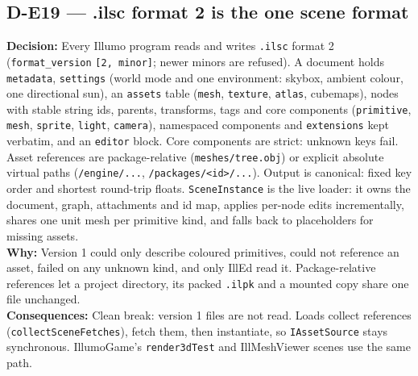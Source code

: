 \subsection*{D-E19 --- .ilsc format 2 is the one scene format}
\begin{decisionbox}[title={D-E19 \quad 2026-09-23}]
\textbf{Decision:} Every Illumo program reads and writes \texttt{.ilsc} format
2 (\texttt{format\_version} \texttt{[2, minor]}; newer minors are refused).
A document holds \texttt{metadata}, \texttt{settings} (world mode and one
environment: skybox, ambient colour, one directional sun), an \texttt{assets}
table (\texttt{mesh}, \texttt{texture}, \texttt{atlas}, cubemaps), nodes with
stable string ids, parents, transforms, tags and core components
(\texttt{primitive}, \texttt{mesh}, \texttt{sprite}, \texttt{light},
\texttt{camera}), namespaced components and \texttt{extensions} kept verbatim,
and an \texttt{editor} block. Core components are strict: unknown keys fail.
Asset references are package-relative (\texttt{meshes/tree.obj}) or explicit
absolute virtual paths (\texttt{/engine/...}, \texttt{/packages/<id>/...}).
Output is canonical: fixed key order and shortest round-trip floats.
\texttt{SceneInstance} is the live loader: it owns the document, graph,
attachments and id map, applies per-node edits incrementally, shares one unit
mesh per primitive kind, and falls back to placeholders for missing assets.\\
\textbf{Why:} Version 1 could only describe coloured primitives, could not
reference an asset, failed on any unknown kind, and only IllEd read it.
Package-relative references let a project directory, its packed
\texttt{.ilpk} and a mounted copy share one file unchanged.\\
\textbf{Consequences:} Clean break: version 1 files are not read. Loads
collect references (\texttt{collectSceneFetches}), fetch them, then
instantiate, so \texttt{IAssetSource} stays synchronous. IllumoGame's
\texttt{render3dTest} and IllMeshViewer scenes use the same path.
\end{decisionbox}


